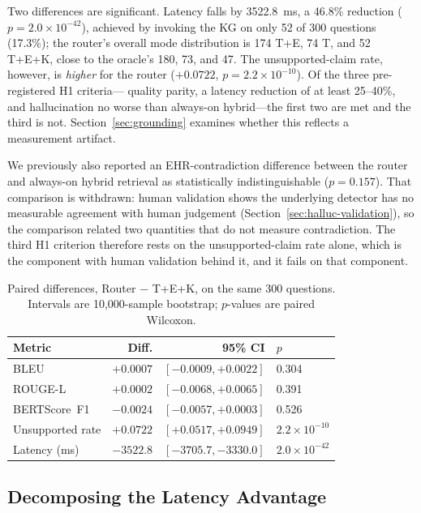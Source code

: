\documentclass[preprint,12pt]{elsarticle}
\begin{document}
Two differences are significant. Latency falls by 3522.8~ms, a 46.8\%
reduction ($p = 2.0\times10^{-42}$), achieved by invoking the KG on
only 52 of 300 questions (17.3\%); the router's overall mode
distribution is 174 T+E, 74 T, and 52 T+E+K, close to the oracle's
180, 73, and 47. The unsupported-claim rate, however, is
\textit{higher} for the router ($+0.0722$,
$p = 2.2\times10^{-10}$). Of the three pre-registered H1 criteria---
quality parity, a latency reduction of at least 25--40\%, and
hallucination no worse than always-on hybrid---the first two are met
and the third is not. Section~\ref{sec:grounding} examines whether
this reflects a measurement artifact.

We previously also reported an EHR-contradiction difference between the
router and always-on hybrid retrieval as statistically indistinguishable
($p = 0.157$). That comparison is withdrawn: human validation shows the
underlying detector has no measurable agreement with human judgement
(Section~\ref{sec:halluc-validation}), so the comparison related two
quantities that do not measure contradiction. The third H1 criterion
therefore rests on the unsupported-claim rate alone, which is the
component with human validation behind it, and it fails on that
component.

\begin{table}[t]
\centering
\footnotesize
\setlength{\tabcolsep}{4pt}
\caption{Paired differences, Router $-$ T+E+K, on the same 300 questions. Intervals are 10{,}000-sample bootstrap; $p$-values are paired Wilcoxon.}
\label{tab:paired}
\begin{tabular}{lrrl}
\toprule
Metric & Diff. & 95\% CI & $p$ \\
\midrule
BLEU              & $+0.0007$ & $[-0.0009, +0.0022]$ & 0.304 \\
ROUGE-L           & $+0.0002$ & $[-0.0068, +0.0065]$ & 0.391 \\
BERTScore~F1      & $-0.0024$ & $[-0.0057, +0.0003]$ & 0.526 \\
Unsupported rate  & $+0.0722$ & $[+0.0517, +0.0949]$ & $2.2\times10^{-10}$ \\
Latency (ms)      & $-3522.8$ & $[-3705.7, -3330.0]$ & $2.0\times10^{-42}$ \\
\bottomrule
\end{tabular}
\end{table}

\subsection{Decomposing the Latency Advantage}
\end{document}
